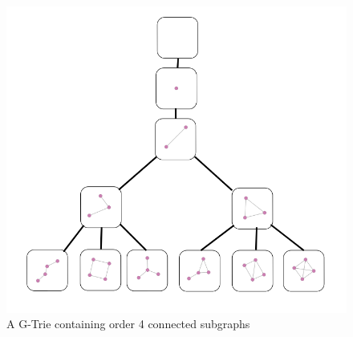 \begin{figure}[b!]
\centering
\includegraphics[scale=.25]{figs/gtrie.png}
\caption{A G-Trie containing order 4 connected subgraphs}
\end{figure}

